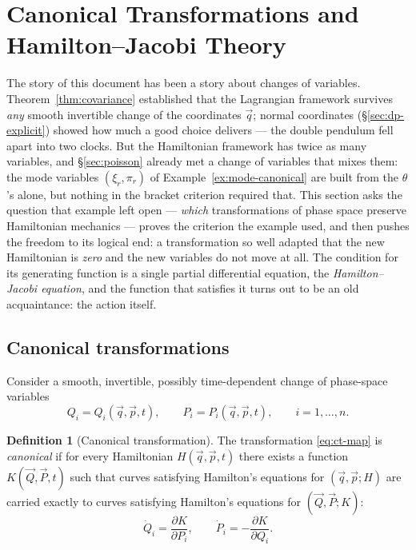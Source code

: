 \documentclass[11pt]{article}
\theoremstyle{plain}
\theoremstyle{definition}
\newtheorem{definition}[theorem]{Definition}
\theoremstyle{remark}
\newcommand{\pd}[2]{\frac{\partial #1}{\partial #2}}
\newcommand{\vq}{\vec{q}}
\newcommand{\vp}{\vec{p}}
\newcommand{\vQ}{\vec{Q}}
\newcommand{\vP}{\vec{P}}
\begin{document}
\section{Canonical Transformations and Hamilton--Jacobi Theory}
\label{sec:hj}

The story of this document has been a story about changes of variables.
Theorem~\ref{thm:covariance} established that the Lagrangian framework
survives \emph{any} smooth invertible change of the coordinates $\vq$;
normal coordinates (\S\ref{sec:dp-explicit}) showed how much a good
choice delivers --- the double pendulum fell apart into two clocks. But the
Hamiltonian framework has twice as many variables, and
\S\ref{sec:poisson} already met a change of variables that mixes them:
the mode variables $(\xi_r, \pi_r)$ of
Example~\ref{ex:mode-canonical} are built from the $\theta$'s alone,
but nothing in the bracket criterion required that. This section asks
the question that example left open --- \emph{which} transformations of
phase space preserve Hamiltonian mechanics --- proves the criterion the
example used, and then pushes the freedom to its logical end: a
transformation so well adapted that the new Hamiltonian is \emph{zero}
and the new variables do not move at all. The condition for its
generating function is a single partial differential equation, the
\emph{Hamilton--Jacobi equation}, and the function that satisfies it
turns out to be an old acquaintance: the action itself.

\subsection{Canonical transformations}
\label{sec:hj-ct}

Consider a smooth, invertible, possibly time-dependent change of
phase-space variables
\begin{equation}
  Q_i = Q_i(\vq, \vp, t), \qquad
  P_i = P_i(\vq, \vp, t), \qquad i = 1, \dots, n .
  \label{eq:ct-map}
\end{equation}

\begin{definition}[Canonical transformation]
\label{def:canonical}
The transformation \eqref{eq:ct-map} is \emph{canonical} if for every
Hamiltonian $H(\vq, \vp, t)$ there exists a function $K(\vQ, \vP, t)$
such that curves satisfying Hamilton's equations for $(\vq, \vp; H)$
are carried exactly to curves satisfying Hamilton's equations for
$(\vQ, \vP; K)$:
\begin{equation}
  \dot Q_i = \pd{K}{P_i}, \qquad \dot P_i = -\pd{K}{Q_i} .
\end{equation}
\end{definition}
\end{document}
